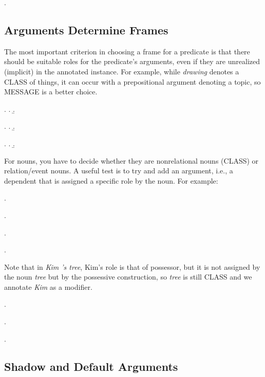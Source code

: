 \documentclass[a4paper]{article}
\newcommand{\fr}[1]{\textsf{#1}}
\newcommand{\rl}[1]{\textsf{#1}}
\begin{document}
\ex.


\newpage\subsection{Arguments Determine Frames}

The most important criterion in choosing a frame for a predicate is that there
should be suitable roles for the predicate's arguments, even if they are
unrealized (implicit) in the annotated instance. For example, while
\emph{drawing} denotes a \fr{CLASS} of things, it can occur with a
prepositional argument denoting a \rl{topic}, so \fr{MESSAGE} is a better
choice.

\ex.
\a.
\b.

\ex.
\a.
\b.

\ex.
\a.
\b.

For nouns, you have to decide whether they are nonrelational nouns (\fr{CLASS})
or relation/event nouns. A useful test is to try and add an argument, i.e., a
dependent that is assigned a specific role by the noun. For example:

\ex.

\ex.

\ex.

\ex.

Note that in \emph{Kim 's tree}, Kim's role is that of \rl{possessor}, but it
is not assigned by the noun \emph{tree} but by the possessive construction, so
\emph{tree} is still \fr{CLASS} and we annotate \emph{Kim} as a modifier.

\ex.

\ex.

\ex.


\newpage\subsection{Shadow and Default Arguments}
\end{document}
